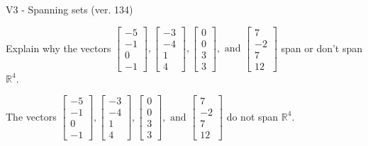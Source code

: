 \begin{exercise}
  \begin{exerciseTitle}V3 - Spanning sets (ver. 134)\end{exerciseTitle}
  \begin{exerciseStatement}
    Explain why the vectors \(\left[\begin{array}{r}
-5 \\
-1 \\
0 \\
-1
\end{array}\right] , \left[\begin{array}{r}
-3 \\
-4 \\
1 \\
4
\end{array}\right] , \left[\begin{array}{r}
0 \\
0 \\
3 \\
3
\end{array}\right] , \text{ and } \left[\begin{array}{r}
7 \\
-2 \\
7 \\
12
\end{array}\right]\) span or don't span \(\mathbb{R}^4\). 
	


  \end{exerciseStatement}
  \begin{exerciseAnswer}
   The vectors \(\left[\begin{array}{r}
-5 \\
-1 \\
0 \\
-1
\end{array}\right] , \left[\begin{array}{r}
-3 \\
-4 \\
1 \\
4
\end{array}\right] , \left[\begin{array}{r}
0 \\
0 \\
3 \\
3
\end{array}\right] , \text{ and } \left[\begin{array}{r}
7 \\
-2 \\
7 \\
12
\end{array}\right]\) 
  	 do not  
	span \(\mathbb{R}^4\).
  


  \end{exerciseAnswer}
\end{exercise}